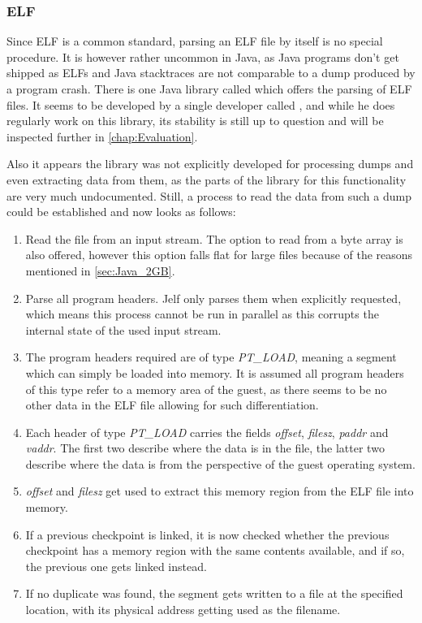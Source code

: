 \subsubsection{ELF}
Since ELF is a common standard, parsing an ELF file by itself is no special procedure.
It is however rather uncommon in Java, as Java programs don't get shipped as ELFs
and Java stacktraces are not comparable to a dump produced by a program crash.
There is one Java library called  which offers the parsing of ELF files.
It seems to be developed by a single developer called ,
and while he does regularly work on this library,
its stability is still up to question and will be inspected further in \autoref{chap:Evaluation}\cite{jelf}.

Also it appears the library was not explicitly developed for processing dumps
and even extracting data from them,
as the parts of the library for this functionality are very much undocumented.
Still, a process to read the data from such a dump could be established and now looks as follows:
\begin{enumerate}
    \item Read the file from an input stream.
    The option to read from a byte array is also offered,
    however this option falls flat for large files because of the reasons mentioned in \autoref{sec:Java_2GB}.
    \item Parse all program headers. Jelf only parses them when explicitly requested,
    which means this process cannot be run in parallel as this corrupts the internal state of the used input stream.
    \item The program headers required are of type \emph{PT\_LOAD},
    meaning a segment which can simply be loaded into memory.
    It is assumed all program headers of this type refer to a memory area of the guest,
    as there seems to be no other data in the ELF file allowing for such differentiation.
    \item Each header of type \emph{PT\_LOAD} carries the fields
    \emph{offset}, \emph{filesz}, \emph{paddr} and \emph{vaddr}.
    The first two describe where the data is in the file,
    the latter two describe where the data is from the perspective of the guest operating system.
    \item \emph{offset} and \emph{filesz} get used to extract this memory region from the ELF file into memory.
    \item If a previous checkpoint is linked, it is now checked
    whether the previous checkpoint has a memory region with the same contents available,
    and if so, the previous one gets linked instead.
    \item If no duplicate was found,
    the segment gets written to a file at the specified location,
    with its physical address getting used as the filename.
\end{enumerate}

